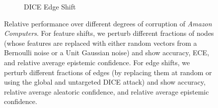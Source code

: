 \begin{figure}
\begin{subfigure}{\textwidth}
        \caption{DICE \citep{Waniek2018} Edge Shift}
    \end{subfigure}
    \caption{Relative performance over different degrees of corruption of \emph{Amazon Computers}. For feature shifts, we perturb different fractions of nodes (whose features are replaced with either random vectors from a Bernoulli noise or a Unit Gaussian noise) and show accuracy, ECE, and relative average epistemic confidence. For edge shifts, we perturb different fractions of edges (by replacing them at random or using the global and untargeted DICE \citep{Waniek2018} attack) and show accuracy, relative average aleatoric confidence, and relative average epistemic confidence.}
    \label{fig:shift-amazon-computers}
\end{figure}